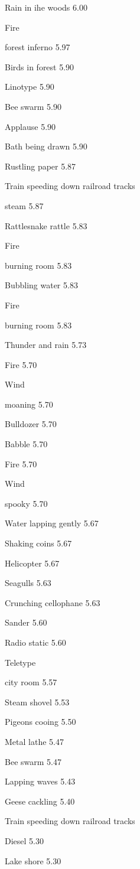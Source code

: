\documentclass{sig-alternate-05-2015}
\begin{document}
{ Rain in ihe woods
6.00 

 Fire 

 forest inferno
5.97 

 Birds in forest
5.90 

 Linotype
5.90 

 Bee swarm
5.90 

 Applause
5.90 

 Bath being drawn
5.90 

 Rustling paper
5.87 

 Train speeding down railroad tracks 

 steam
5.87 

 Rattlesnake rattle
5.83 

 Fire 

 burning room
5.83 

 Bubbling water
5.83 

 Fire 

 burning room
5.83 

 Thunder and rain
5.73 

 Fire
5.70 

 Wind 

 moaning
5.70 

 Bulldozer
5.70 

 Babble
5.70 

 Fire
5.70 

 Wind 

 spooky
5.70 

 Water lapping gently
5.67 

 Shaking coins
5.67 

 Helicopter
5.67 

 Seagulls
5.63 

 Crunching cellophane
5.63 

 Sander
5.60 

 Radio static
5.60 

 Teletype 

 city room
5.57 

 Steam shovel
5.53 

 Pigeons cooing
5.50 

 Metal lathe
5.47 

 Bee swarm
5.47 

 Lapping waves
5.43 

 Geese cackling
5.40 

 Train speeding down railroad tracks 

 Diesel
5.30 

 Lake shore
5.30 

}
\end{document}
